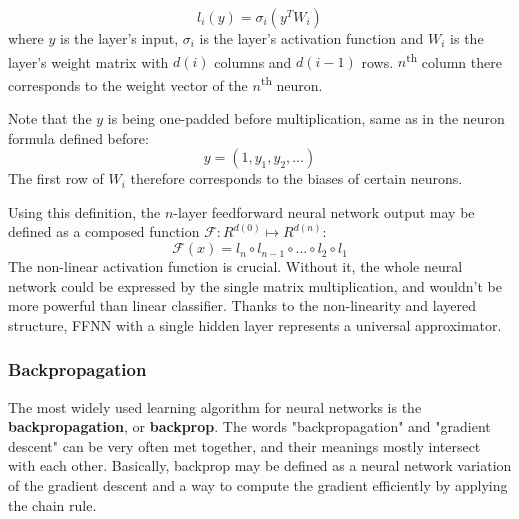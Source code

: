 \documentclass[thesis=B,english]{FITthesis}[2019/12/23]
\begin{document}
	\[l_i(y) = \sigma_i(y^TW_i)\]
	where $y$ is the layer's input, $\sigma_i$ is the layer's activation function and $W_i$ is the layer's weight matrix with $d(i)$ columns and $d(i-1)$ rows. $n$\textsuperscript{th} column there corresponds to the weight vector of the $n$\textsuperscript{th} neuron.
	
	Note that the $y$ is being one-padded before multiplication, same as in the neuron formula defined before:
	\[y = (1, y_1, y_2, \dots)\]
	The first row of $W_i$ therefore corresponds to the biases of certain neurons.
	
	Using this definition, the $n$-layer feedforward neural network output may be defined as a composed function $\mathcal{F} : R^{d(0)} \mapsto R^{d(n)}$:
	\[\mathcal{F}(x) = l_n \circ l_{n-1} \circ \dots \circ l_2 \circ l_1\]
	The non-linear activation function is crucial. Without it, the whole neural network could be expressed by the single matrix multiplication, and wouldn't be more powerful than linear classifier. Thanks to the non-linearity and layered structure, FFNN with a single hidden layer represents a universal approximator\cite{universal_approx_wiki}\cite[Chapter~4]{nndl_universal_approx}.
	
	\subsubsection{Backpropagation}
	
	The most widely used learning algorithm for neural networks is the \textbf{backpropagation}, or \textbf{backprop}. The words "backpropagation" and "gradient descent" can be very often met together, and their meanings mostly intersect with each other. Basically, backprop may be defined as a neural network variation of the gradient descent and a way to compute the gradient efficiently by applying the chain rule\cite{chain_rule}.
	
\end{document}

